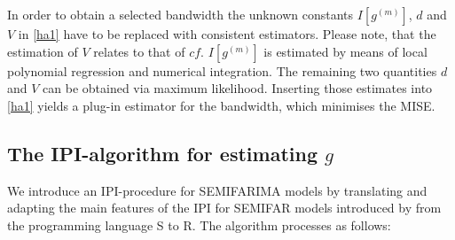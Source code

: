 \documentclass[12pt]{article}
\begin{document}
In order to obtain a selected bandwidth the unknown constants $I[g^{(m)}]$, $d$ and $V$ in \eqref{ha1} have to be replaced with consistent estimators. Please note, that the estimation of $V$ relates to that of $cf$. $I[g^{(m)}]$ is estimated by means of local polynomial regression and numerical integration. The remaining two quantities $d$ and $V$ can be obtained via maximum likelihood. Inserting those estimates into \eqref{ha1} yields a plug-in estimator for the bandwidth, which minimises the MISE.

\subsection{The IPI-algorithm for estimating $g$}

We introduce an IPI-procedure for SEMIFARIMA models by translating and adapting the main features of the IPI for SEMIFAR models introduced by \citet{beran2002iterative} from the programming language S to R. The algorithm processes as follows:
\end{document}
